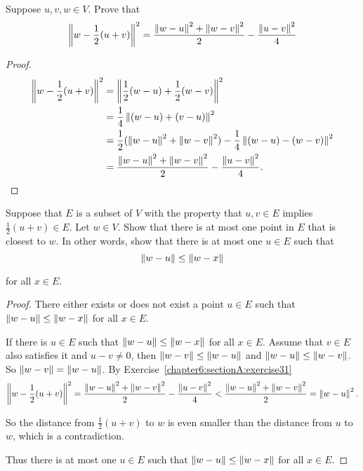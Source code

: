 \begin{exercise}\label{chapter6:sectionA:exercise31}
    Suppose $u, v, w \in V$. Prove that
    \[
        \left\Vert{w - \frac{1}{2}(u + v)}\right\Vert^{2} = \frac{\left\Vert{w - u}\right\Vert^{2} + \left\Vert{w - v}\right\Vert^{2}}{2} - \frac{\left\Vert{u - v}\right\Vert^{2}}{4}
    \]
\end{exercise}

\begin{proof}
    \begin{align*}
        \left\Vert{w - \frac{1}{2}(u + v)}\right\Vert^{2} & = \left\Vert{\frac{1}{2}(w - u) + \frac{1}{2}(w - v)}\right\Vert^{2}                                         \\
                                          & = \frac{1}{4}\left\Vert{(w - u) + (v - u)}\right\Vert^{2}                                                    \\
                                          & = \frac{1}{2}(\left\Vert{w - u}\right\Vert^{2} + \left\Vert{w - v}\right\Vert^{2}) - \frac{1}{4}\left\Vert{(w - u) - (w - v)}\right\Vert^{2} \\
                                          & = \frac{\left\Vert{w - u}\right\Vert^{2} + \left\Vert{w - v}\right\Vert^{2}}{2} - \frac{\left\Vert{u - v}\right\Vert^{2}}{4}.
    \end{align*}
\end{proof}
\newpage

\begin{exercise}
    Suppose that $E$ is a subset of $V$ with the property that $u, v\in E$ implies $\frac{1}{2}(u + v)\in E$. Let $w\in V$. Show that there is at most one point in $E$ that is closest to $w$. In other words, show that there is at most one $u\in E$ such that
    \[
        \left\Vert{w - u}\right\Vert\leq \left\Vert{w - x}\right\Vert
    \]

    for all $x\in E$.
\end{exercise}

\begin{proof}
    There either exists or does not exist a point $u\in E$ such that $\left\Vert{w - u}\right\Vert\leq \left\Vert{w - x}\right\Vert$ for all $x\in E$.

    If there is $u\in E$ such that $\left\Vert{w - u}\right\Vert\leq \left\Vert{w - x}\right\Vert$ for all $x\in E$. Assume that $v\in E$ also satisfies it and $u - v\ne 0$, then $\left\Vert{w - v}\right\Vert\leq \left\Vert{w - u}\right\Vert$ and $\left\Vert{w - u}\right\Vert\leq \left\Vert{w - v}\right\Vert$. So $\left\Vert{w - v}\right\Vert = \left\Vert{w - u}\right\Vert$. By Exercise~\ref{chapter6:sectionA:exercise31}
    \[
        \left\Vert{w - \frac{1}{2}(u + v)}\right\Vert^{2} = \frac{\left\Vert{w - u}\right\Vert^{2} + \left\Vert{w - v}\right\Vert^{2}}{2} - \frac{\left\Vert{u - v}\right\Vert^{2}}{4} < \frac{\left\Vert{w - u}\right\Vert^{2} + \left\Vert{w - v}\right\Vert^{2}}{2} = \left\Vert{w - u}\right\Vert^{2}.
    \]

    So the distance from $\frac{1}{2}(u + v)$ to $w$ is even smaller than the distance from $u$ to $w$, which is a contradiction.

    Thus there is at most one $u\in E$ such that $\left\Vert{w - u}\right\Vert\leq \left\Vert{w - x}\right\Vert$ for all $x\in E$.
\end{proof}
\newpage


